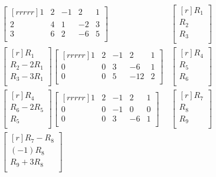 \documentclass[12pt]{article}
\begin{document}
\begin{enumerate}
\begin{enumerate}
	\begin{align*}
	\begin{bmatrix}[rrrrr]
	1 & 2 & -1 & 2 & 1\\
	2 & 4 & 1 & -2 & 3\\
	3 & 6 & 2 & -6 & 5\\
	\end{bmatrix}&
	\begin{bmatrix}[r]
	R_1\\ R_2\\ R_3\\
	\end{bmatrix}\\
	\begin{bmatrix}[r]
	R_1\\	
	R_2 - 2R_1\\
	R_3 - 3R_1\\
	\end{bmatrix}
	\begin{bmatrix}[rrrrr]
	1 & 2 & -1 & 2 & 1\\
	0 & 0 & 3 & -6 & 1\\
	0 & 0 & 5 & -12 & 2\\
	\end{bmatrix}&
	\begin{bmatrix}[r]
	R_4\\ R_5\\ R_6\\
	\end{bmatrix}\\
	\begin{bmatrix}[r]
	R_4\\
	R_6-2R_5\\	
	R_5\\
	\end{bmatrix}
	\begin{bmatrix}[rrrrr]
	1 & 2 & -1 & 2 & 1\\
	0 & 0 & -1 & 0 & 0\\	
	0 & 0 & 3 & -6 & 1\\
	\end{bmatrix}&
	\begin{bmatrix}[r]
	R_7\\ R_8\\ R_9\\
	\end{bmatrix}\\
	\begin{bmatrix}[r]
	R_7 - R_8\\
	(-1)R_8\\
	R_9 + 3R_8\\

\end{bmatrix}
\end{align*}
\end{enumerate}
\end{enumerate}
\end{document}
